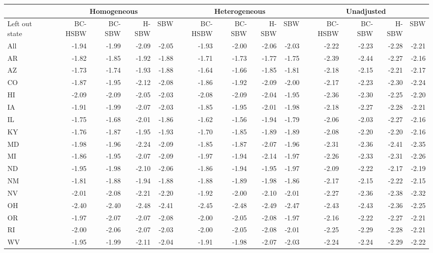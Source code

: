 \begin{landscape}
\captionsetup[table]{labelformat=empty,skip=1pt}
\begin{table}\caption{Leave one state out jackknife point estimates: all estimators, early expansion excluded}\label{tab:loojackknifec2}
\begin{longtable}{lrrrr|rrrr|rrrr}
\hline
 & \multicolumn{4}{c}{Homogeneous} & \multicolumn{4}{c}{Heterogeneous} & \multicolumn{4}{c}{Unadjusted} \\ 
 \hline
Left out state & BC-HSBW & BC-SBW & H-SBW & SBW & BC-HSBW & BC-SBW & H-SBW & SBW & BC-HSBW & BC-SBW & H-SBW & SBW \\ 
\hline
All & -1.94 & -1.99 & -2.09 & -2.05 & -1.93 & -2.00 & -2.06 & -2.03 & -2.22 & -2.23 & -2.28 & -2.21 \\ 
AR & -1.82 & -1.85 & -1.92 & -1.88 & -1.71 & -1.73 & -1.77 & -1.75 & -2.39 & -2.44 & -2.27 & -2.16 \\ 
AZ & -1.73 & -1.74 & -1.93 & -1.88 & -1.64 & -1.66 & -1.85 & -1.81 & -2.18 & -2.15 & -2.21 & -2.17 \\ 
CO & -1.87 & -1.95 & -2.12 & -2.08 & -1.86 & -1.92 & -2.09 & -2.00 & -2.17 & -2.23 & -2.30 & -2.24 \\ 
HI & -2.09 & -2.09 & -2.05 & -2.03 & -2.08 & -2.09 & -2.04 & -1.95 & -2.36 & -2.30 & -2.25 & -2.20 \\ 
IA & -1.91 & -1.99 & -2.07 & -2.03 & -1.85 & -1.95 & -2.01 & -1.98 & -2.18 & -2.27 & -2.28 & -2.21 \\ 
IL & -1.75 & -1.68 & -2.01 & -1.86 & -1.62 & -1.56 & -1.94 & -1.79 & -2.06 & -2.03 & -2.27 & -2.16 \\ 
KY & -1.76 & -1.87 & -1.95 & -1.93 & -1.70 & -1.85 & -1.89 & -1.89 & -2.08 & -2.20 & -2.20 & -2.16 \\ 
MD & -1.98 & -1.96 & -2.24 & -2.09 & -1.85 & -1.87 & -2.07 & -1.96 & -2.31 & -2.36 & -2.41 & -2.35 \\ 
MI & -1.86 & -1.95 & -2.07 & -2.09 & -1.97 & -1.94 & -2.14 & -1.97 & -2.26 & -2.33 & -2.31 & -2.26 \\ 
ND & -1.95 & -1.98 & -2.10 & -2.06 & -1.86 & -1.94 & -1.95 & -1.97 & -2.09 & -2.22 & -2.17 & -2.19 \\ 
NM & -1.81 & -1.88 & -1.94 & -1.88 & -1.88 & -1.89 & -1.98 & -1.86 & -2.17 & -2.15 & -2.22 & -2.15 \\ 
NV & -2.01 & -2.08 & -2.21 & -2.20 & -1.92 & -2.00 & -2.10 & -2.01 & -2.27 & -2.36 & -2.38 & -2.32 \\ 
OH & -2.40 & -2.40 & -2.48 & -2.41 & -2.45 & -2.48 & -2.49 & -2.47 & -2.43 & -2.43 & -2.36 & -2.25 \\ 
OR & -1.97 & -2.07 & -2.07 & -2.08 & -2.00 & -2.05 & -2.08 & -1.97 & -2.16 & -2.22 & -2.27 & -2.21 \\ 
RI & -2.00 & -2.06 & -2.07 & -2.03 & -2.00 & -2.05 & -2.08 & -2.01 & -2.25 & -2.29 & -2.28 & -2.21 \\ 
WV & -1.95 & -1.99 & -2.11 & -2.04 & -1.91 & -1.98 & -2.07 & -2.03 & -2.24 & -2.24 & -2.29 & -2.22 \\ 
 \hline
\end{longtable}
\end{table}

\end{landscape}

\clearpage
